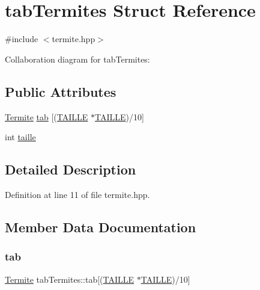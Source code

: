 \hypertarget{structtabTermites}{}\section{tab\+Termites Struct Reference}
\label{structtabTermites}


{\ttfamily \#include $<$termite.\+hpp$>$}



Collaboration diagram for tab\+Termites\+:
\subsection*{Public Attributes}
\begin{DoxyCompactItemize}
\item 
\hyperlink{structTermite}{Termite} \hyperlink{structtabTermites_aec7d894bba416023649f8409ae39cc23}{tab} \mbox{[}(\hyperlink{grille_8hpp_a3af25ad4074904b83ee7cca27a822751}{T\+A\+I\+L\+LE} $\ast$\hyperlink{grille_8hpp_a3af25ad4074904b83ee7cca27a822751}{T\+A\+I\+L\+LE})/10\mbox{]}
\item 
int \hyperlink{structtabTermites_a0fe7fc43b7bac06c6fc7c85dd8022126}{taille}
\end{DoxyCompactItemize}


\subsection{Detailed Description}


Definition at line 11 of file termite.\+hpp.



\subsection{Member Data Documentation}
\mbox{\label{structtabTermites_aec7d894bba416023649f8409ae39cc23}} 
\subsubsection{\texorpdfstring{tab}{tab}}
{\footnotesize\ttfamily \hyperlink{structTermite}{Termite} tab\+Termites\+::tab\mbox{[}(\hyperlink{grille_8hpp_a3af25ad4074904b83ee7cca27a822751}{T\+A\+I\+L\+LE} $\ast$\hyperlink{grille_8hpp_a3af25ad4074904b83ee7cca27a822751}{T\+A\+I\+L\+LE})/10\mbox{]}}



